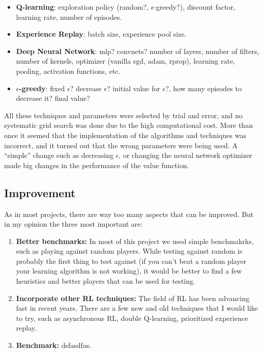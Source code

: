 \documentclass{article}
\begin{document}
\begin{itemize}

    \item \textbf{Q-learning}: exploration policy (random?, $\epsilon$-greedy?), discount factor,
        learning rate, number of episodes.

    \item \textbf{Experience Replay}: batch size, experience pool size.

    \item \textbf{Deep Neural Network}: mlp? convnets? number of layers, number of filters, number
        of kernels, optimizer (vanilla sgd, adam, rprop), learning rate, pooling, activation
        functions, etc.

    \item \textbf{$\epsilon$-greedy}: fixed $\epsilon$? decrease $\epsilon$? initial value for
        $\epsilon$?, how many episodes to decrease it? final value?

\end{itemize}

All these techniques and parameters were selected by trial and error, and no systematic grid search
was done due to the high computational cost. More than once it seemed that the implementation of the
algorithms and techniques was incorrect, and it turned out that the wrong parameters were being
used. A ``simple'' change such as decreasing $\epsilon$, or changing the neural network optimizer
made big changes in the performance of the value function.

\subsection{Improvement}

As in most projects, there are way too many aspects that can be improved. But in my opinion the
three most important are:

\begin{enumerate}

    \item \textbf{Better benchmarks:} In most of this project we used simple benchmakrks, such as
        playing against random players. While testing against random is probably the first thing to
        test against (if you can't beat a random player your learning algorithm is not working), it
        would be better to find a few heuristics and better players that can be used for testing.

    \item \textbf{Incorporate other RL techniques:} The field of RL has been advancing fast in
        recent years. There are a few new and old techniques that I would like to try, such as
        asynchronous RL, double Q-learning, prioritized experience replay.

    \item \textbf{Benchmark:} dsfasdfas.

\end{enumerate}




\end{document}

